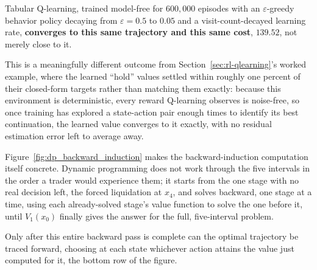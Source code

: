 \documentclass[../ai_in_finance]{subfiles}
\begin{document}
Tabular Q-learning, trained model-free for $600{,}000$ episodes with an $\varepsilon$-greedy behavior policy decaying from $\varepsilon=0.5$ to $0.05$ and a visit-count-decayed learning rate, \textbf{converges to this same trajectory and this same cost}, $139.52$, not merely close to it.

This is a meaningfully different outcome from Section~\ref{sec:rl-qlearning}'s worked example, where the learned ``hold'' values settled within roughly one percent of their closed-form targets rather than matching them exactly: because this environment is deterministic, every reward Q-learning observes is noise-free, so once training has explored a state-action pair enough times to identify its best continuation, the learned value converges to it exactly, with no residual estimation error left to average away.

Figure~\ref{fig:dp_backward_induction} makes the backward-induction computation itself concrete. Dynamic programming does not work through the five intervals in the order a trader would experience them; it starts from the one stage with no real decision left, the forced liquidation at $x_4$, and solves backward, one stage at a time, using each already-solved stage's value function to solve the one before it, until $V_1(x_0)$ finally gives the answer for the full, five-interval problem.

Only after this entire backward pass is complete can the optimal trajectory be traced forward, choosing at each state whichever action attains the value just computed for it, the bottom row of the figure.
\end{document}
